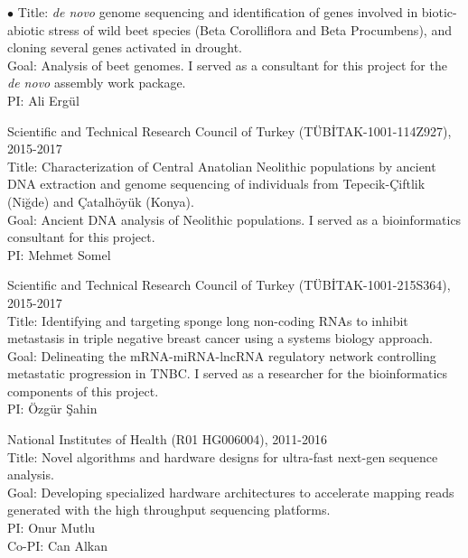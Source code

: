 \documentclass[margin,line]{res}
\newenvironment{list2}{
  \begin{list}{$\bullet$}{%
      \setlength{\itemsep}{0.1cm}
      \setlength{\parsep}{0in} \setlength{\parskip}{0in}
      \setlength{\topsep}{0in} \setlength{\partopsep}{0in} 
      \setlength{\leftmargin}{0.2in}}}{\end{list}}
\begin{document}
\begin{resume}
\begin{list2}
                                         Title: {\it de novo} genome sequencing and identification of genes involved in biotic-abiotic stress of wild beet species 
                                         (Beta Corolliflora and Beta Procumbens), and cloning several genes activated in drought.\\
                                         Goal: Analysis of beet genomes. I served as a consultant for this project for the {\it de novo} assembly work package.\\
                                         PI: Ali Ergül
                                       \item
                                         Scientific and Technical Research Council of Turkey (T\"{U}B\.{I}TAK-1001-114Z927), 2015-2017\\
                                         Title: Characterization of Central Anatolian Neolithic populations by ancient DNA extraction and genome sequencing of individuals 
                                         from Tepecik-Çiftlik (Niğde) and Çatalhöyük (Konya).\\
                                         Goal: Ancient DNA analysis of Neolithic populations. I served as a bioinformatics consultant for this project.\\
                                         PI: Mehmet Somel
\clearpage                                        
                                       \item
                                         Scientific and Technical Research Council of Turkey (T\"{U}B\.{I}TAK-1001-215S364), 2015-2017\\
                                         Title: Identifying and targeting sponge long non-coding RNAs to inhibit metastasis in triple negative breast cancer
                                         using a systems biology approach.\\
                                         Goal: Delineating the mRNA-miRNA-lncRNA regulatory network controlling metastatic progression in TNBC. I served as a researcher
                                         for the bioinformatics components of this project.\\
                                         PI: Özgür Şahin
                                       \item
                                         National Institutes of Health (R01 HG006004), 2011-2016\\
                                         Title: Novel algorithms and hardware designs for ultra-fast next-gen sequence analysis.\\
                                         Goal: Developing specialized hardware architectures to accelerate mapping reads generated with the high throughput sequencing platforms.\\
                                         PI: Onur Mutlu\\
                                         Co-PI: Can Alkan


\end{list2}
\end{resume}
\end{document}

